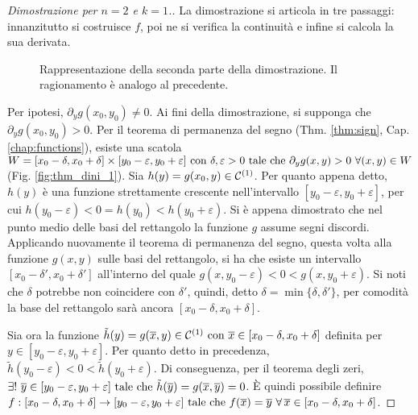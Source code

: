 \begin{proof}
    [Dimostrazione per $n=2$ e $k=1$.]
    La dimostrazione si articola in tre passaggi: innanzitutto si costruisce $f$, poi ne si verifica la continuità e infine si calcola la sua derivata.
    
    \begin{figure}[ht]
		\centering
		\begin{minipage}[t]{0.45\textwidth}
			\def\svgwidth{\textwidth}
		  	
		  	\caption{Rappresentazione della prima parte della dimostrazione. Le lunghezze \(\delta \) e \(\varepsilon \) indicano la larghezza del pluri-intervallo centrato in \((x_0,y_0)\) in cui \(\partial _y g(x,y) >0\). I segni \(+\) e \(-\) indicano gli intervalli sulle basi in cui \(g(x,y)>0\).}
            \label{fig:thm_dini_1}
		\end{minipage}
		\hfill
		\begin{minipage}[t]{0.45\textwidth}
			\def\svgwidth{\textwidth}
			
		  	\caption{Rappresentazione della seconda parte della dimostrazione. Il ragionamento è analogo al precedente.}
            \label{fig:thm_dini_2}
		\end{minipage}
	\end{figure}

    Per ipotesi, $\partial_yg(x_0,y_0) \neq 0$. Ai fini della dimostrazione, si supponga che $\partial_yg(x_0,y_0) > 0$. Per il teorema di permanenza del segno (Thm. \ref{thm:sign}, Cap. \ref{chap:functions}), esiste una scatola $W=[x_0-\delta,x_0+\delta]\times[y_0-\varepsilon,y_0+\varepsilon]\text{ con } \delta,\varepsilon>0 \text{ tale che } \partial_yg(x,y)>0\ \forall (x,y)\in W$ (Fig. \ref{fig:thm_dini_1}). Sia $h(y)=g(x_0,y)\in\mathcal{C}^{(1)}$. Per quanto appena detto, $h(y)$ è una funzione strettamente crescente nell'intervallo $[y_0-\varepsilon, y_0+\varepsilon]$, per cui $h(y_0-\varepsilon)<0=h(y_0)<h(y_0+\varepsilon)$. Si è appena dimostrato che nel punto medio delle basi del rettangolo la funzione $g$ assume segni discordi. Applicando nuovamente il teorema di permanenza del segno, questa volta alla funzione $g(x,y)$ sulle basi del rettangolo, si ha che esiste un intervallo $[x_0-\delta ', x_0+\delta ']$ all'interno del quale $g(x,y_0-\varepsilon)<0<g(x,y_0+\varepsilon)$. Si noti che $\delta$ potrebbe non coincidere con $\delta '$, quindi, detto $\delta=\min\{\delta,\delta '\}$, per comodità la base del rettangolo sarà ancora $[x_0-\delta,x_0+\delta]$.
    

    Sia ora la funzione $\tilde{h}(y)=g(\overline{x},y) \in \mathcal{C}^{(1)} \text{ con } \overline{x} \in [x_0-\delta,x_0+\delta]$ definita per $y \in [y_0-\varepsilon,y_0+\varepsilon]$. Per quanto detto in precedenza, $\tilde{h}(y_0-\varepsilon)<0<\tilde{h}(y_0+\varepsilon)$. Di conseguenza, per il teorema degli zeri, $\exists!\ \overline{y} \in [y_0-\varepsilon,y_0+\varepsilon] \text{ tale che } \tilde{h}(\overline{y})=g(\overline{x},\overline{y})=0$. È quindi possibile definire $f:[x_0-\delta,x_0+\delta]\to[y_0-\varepsilon,y_0+\varepsilon] \text{ tale che } f(\overline{x})=\overline{y} \ \forall\, \overline{x} \in [x_0-\delta,x_0+\delta]$.



\end{proof}
